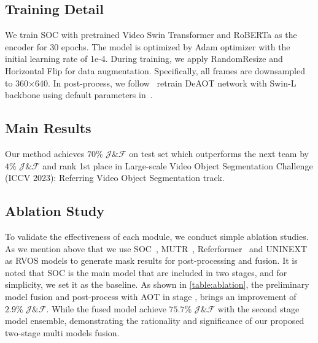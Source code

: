 \documentclass[10pt,twocolumn,letterpaper]{article}
\begin{document}
\subsection{Training Detail} 
We train SOC with pretrained Video Swin Transformer and RoBERTa as the encoder for 30 epochs. The model is optimized by Adam optimizer with the initial learning rate of 1e-4. During training, we apply RandomResize and Horizontal Flip for data augmentation.
Specifically, all frames are downsampled to 360×640. In post-process, we follow~\cite{last_champ} retrain DeAOT network with Swin-L backbone using default parameters in~\cite{deaot}. 




\subsection{Main Results}
Our method achieves $70\%$ $\mathcal{J} \& \mathcal{F}$ on test set which outperforms the next team by $4\%$ $\mathcal{J} \& \mathcal{F}$ and rank 1st place in Large-scale Video Object Segmentation Challenge (ICCV 2023): Referring Video Object Segmentation track.


\subsection{Ablation Study} 
To validate the effectiveness of each module, we conduct simple ablation studies. As we mention above that we use SOC~\cite{soc}, MUTR~\cite{mutr}, Referformer~\cite{referformer} and UNINEXT~\cite{UNINEXT} as RVOS models to generate mask results for post-processing and fusion. It is noted that SOC is the main model that are included in two stages, and for simplicity, we set it as the baseline. As shown in \cref{table:ablation}, the preliminary model fusion and post-process with AOT in stage \uppercase\expandafter{},  brings an improvement of $2.9\%$ $\mathcal{J} \& \mathcal{F}$. While the fused model achieve $75.7\%$ $\mathcal{J} \& \mathcal{F}$ with the second stage model ensemble, demonstrating the rationality and significance of our proposed two-stage multi models fusion.  
\end{document}
